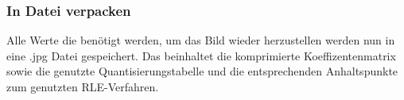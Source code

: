 \documentclass{article}
\begin{document}
\subsubsection{In Datei verpacken}
Alle Werte die benötigt werden, um das Bild wieder herzustellen werden nun in eine .jpg Datei gespeichert. Das beinhaltet die komprimierte Koeffizentenmatrix sowie die genutzte Quantisierungstabelle und die entsprechenden Anhaltspunkte zum genutzten RLE-Verfahren.
\end{document}
